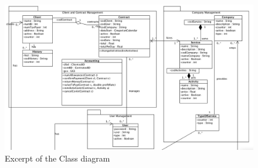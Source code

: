 \begin{figure}[H]
\begin{center}
\includegraphics[scale=0.35]{images/classbw.png}
\caption{Excerpt of the Class diagram}\label{img:class}
\end{center}
\end{figure} 

